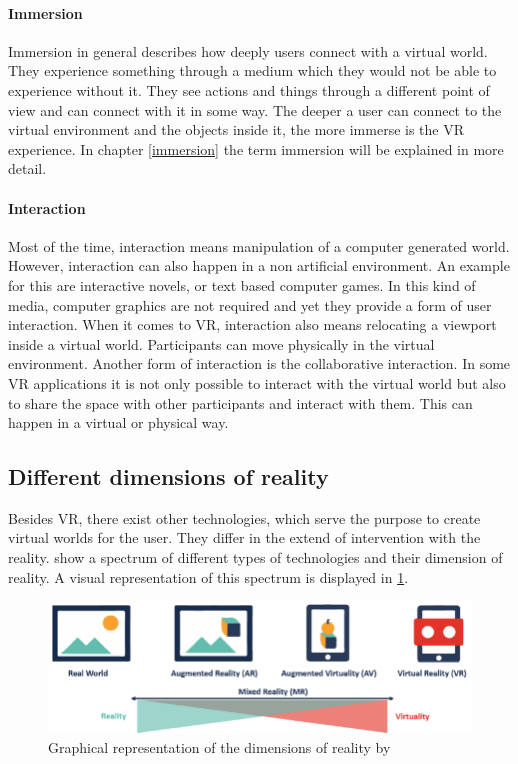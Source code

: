 \paragraph{Immersion} Immersion in general describes how deeply users connect with a virtual world. They experience something through a medium which they would not be able to experience without it. They see actions and things through a different point of view and can connect with it in some way. The deeper a user can connect to the virtual environment and the objects inside it, the more immerse is the VR experience. In chapter \ref{immersion} the term immersion will be explained in more detail.

\paragraph{Interaction} Most of the time, interaction means manipulation of a computer generated world. However, interaction can also happen in a non artificial environment. An example for this are interactive novels, or text based computer games. In this kind of media, computer graphics are not required and yet they provide a form of user interaction. When it comes to VR, interaction also means relocating a viewport inside a virtual world. Participants can move physically in the virtual environment. Another form of interaction is the collaborative interaction. In some VR applications it is not only possible to interact with the virtual world but also to share the space with other participants and interact with them. This can happen in a virtual or physical way.
\subsection{Different dimensions of reality}
Besides VR, there exist other technologies, which serve the purpose to create virtual worlds for the user. They differ in the extend of intervention with the reality. \cite{Tham.2018} show a spectrum of different types of technologies and their dimension of reality. A visual representation of this spectrum is displayed in \ref{fig:spectrum}.\\
\begin{figure}[h!]
  \includegraphics[width=14cm]{kapitel/spectrum-of-reality.png}
  \centering
  \caption{Graphical representation of the dimensions of reality by 	  \cite{Lovreglio.2018}}
  \label{fig:spectrum}
\end{figure}

